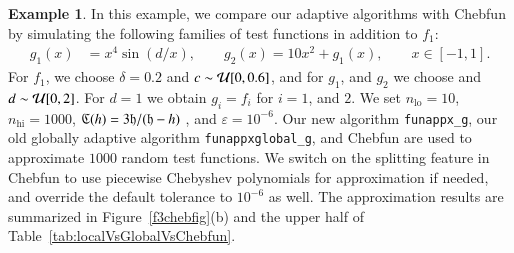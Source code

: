 \documentclass[review]{elsarticle}
\newcommand{\abstol}{\varepsilon}
\theoremstyle{definition}
\newtheorem{exmp}{Example}
\newcommand{\funappxg}{\texttt{funappx\_g}\xspace}
\begin{document}

\begin{exmp}
In this example, we compare our adaptive algorithms with Chebfun by
simulating the following families of test functions  in addition to $f_1$:
%
\begin{align*}
 g_1(x) &= x^4 \sin(d/x), \qquad
 g_2(x) = 10  x^2 + g_1(x), \qquad x \in [-1, 1].
\end{align*}
For $f_1$, we choose $\delta = 0.2$ and $c \sim \mathcal{U}[0,0.6]$, and for $g_1$, and
$g_2$ we choose and $d \sim \mathcal{U}[0,2]$. For $d=1$ we obtain $g_i = f_i$ for
$i=1$, and $2$. We set $n_{\text{lo}} = 10$, $n_{\text{hi}} = 1000$, $\mathfrak{C} (h) =
3 \mathfrak{h}/(\mathfrak{h}-h)$ , and $\abstol = 10^{-6}$. Our new algorithm \texttt{funappx\_g},
our old globally adaptive algorithm \texttt{funappxglobal\_g}, and Chebfun are
used to approximate $1000$ random test functions. We switch on the splitting
feature in Chebfun to use piecewise Chebyshev polynomials for approximation if
needed, and override the default tolerance to $10^{-6}$ as well. The
approximation results are summarized in Figure~\ref{f3chebfig}(b) and the upper half of
Table~\ref{tab:localVsGlobalVsChebfun}.


\end{exmp}
\end{document}
